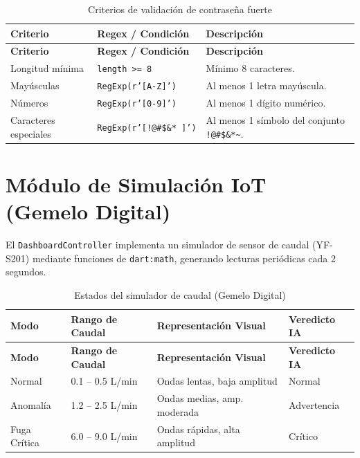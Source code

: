 \documentclass[12pt,a4paper]{article}
\begin{document}
\begin{longtable}{p{3cm} p{5cm} p{5.5cm}}
\caption{Criterios de validación de contraseña fuerte} \label{tab:criterios-pass} \\
\toprule
\textbf{Criterio} & \textbf{Regex / Condición} & \textbf{Descripción} \\
\midrule
\endfirsthead
\toprule
\textbf{Criterio} & \textbf{Regex / Condición} & \textbf{Descripción} \\
\midrule
\endhead
\bottomrule
\endlastfoot
Longitud mínima   & \texttt{length >= 8}            & Mínimo 8 caracteres. \\
Mayúsculas        & \texttt{RegExp(r'[A-Z]')}        & Al menos 1 letra mayúscula. \\
Números           & \texttt{RegExp(r'[0-9]')}        & Al menos 1 dígito numérico. \\
Caracteres especiales & \texttt{RegExp(r'[!@\#\$\&*~]')} & Al menos 1 símbolo del conjunto \texttt{!@\#\$\&*\textasciitilde}. \\
\end{longtable}

\section{Módulo de Simulación IoT (Gemelo Digital)}

El \texttt{DashboardController} implementa un simulador de sensor de caudal (YF-S201)
mediante funciones de \texttt{dart:math}, generando lecturas periódicas cada 2 segundos.

\begin{longtable}{p{3.5cm} p{3.5cm} p{3.5cm} p{3cm}}
\caption{Estados del simulador de caudal (Gemelo Digital)} \label{tab:simulador} \\
\toprule
\textbf{Modo} & \textbf{Rango de Caudal} & \textbf{Representación Visual} & \textbf{Veredicto IA} \\
\midrule
\endfirsthead
\toprule
\textbf{Modo} & \textbf{Rango de Caudal} & \textbf{Representación Visual} & \textbf{Veredicto IA} \\
\midrule
\endhead
\bottomrule
\endlastfoot
Normal    & 0.1 -- 0.5 L/min & Ondas lentas, baja amplitud  & Normal \\
Anomalía  & 1.2 -- 2.5 L/min & Ondas medias, amp. moderada  & Advertencia \\
Fuga Crítica & 6.0 -- 9.0 L/min & Ondas rápidas, alta amplitud & Crítico \\
\end{longtable}
\end{document}
